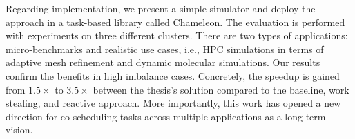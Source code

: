Regarding implementation, we present a simple simulator and deploy the approach in a task-based library called Chameleon. The evaluation is performed with experiments on three different clusters. There are two types of applications: micro-benchmarks and realistic use cases, i.e., HPC simulations in terms of adaptive mesh refinement and dynamic molecular simulations. Our results confirm the benefits in high imbalance cases. Concretely, the speedup is gained from $1.5\times$ to $3.5\times$ between the thesis's solution compared to the baseline, work stealing, and reactive approach. More importantly, this work has opened a new direction for co-scheduling tasks across multiple applications as a long-term vision.


%
%
%

